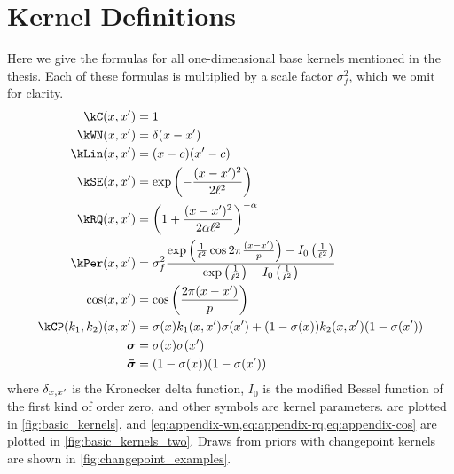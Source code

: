 \chapter{Kernel Definitions}
\label{ch:appendix-kernels}
\label{sec:kernel-definitions}

\newcommand{\scalefactor}{}


Here we give the formulas for all one-dimensional base kernels mentioned in the thesis.
Each of these formulas is multiplied by a scale factor $\sigma_f^2$, which we omit for clarity.
\begin{align}
\kC(\inputVar, \inputVar') & = \scalefactor 1 \\
\kWN(\inputVar, \inputVar') & = \scalefactor \delta(\inputVar - \inputVar') \label{eq:appendix-wn}\\
\kLin(\inputVar, \inputVar') & = \scalefactor (\inputVar - c)(\inputVar' - c)  \label{eq:appendix-lin} \\
\kSE(\inputVar, \inputVar') & = \scalefactor \exp\left(-\frac{(\inputVar - \inputVar')^2}{2\ell^2}\right)  \label{eq:appendix-se}\\
\kRQ(x, x') & = \scalefactor \left( 1 + \frac{(\inputVar - \inputVar')^2}{2\alpha\ell^2}\right)^{-\alpha}  \label{eq:appendix-rq}\\
\kPer(\inputVar, \inputVar') & =  \sigma_f^2 \frac{\exp\left(\frac{1}{\ell^2}\cos 2 \pi  \frac{(\inputVar - \inputVar')}{p}\right) - I_0\left(\frac{1}{\ell^2}\right)}{\exp\left(\frac{1}{\ell^2}\right) - I_0\left(\frac{1}{\ell^2}\right)} \label{eq:generalized-periodic} \\
\cos(x, x') & = \scalefactor \cos\left(\frac{2 \pi (x - x')}{p}\right) \label{eq:appendix-cos} \\
\kCP(\kernel_1, \kernel_2)(x, x') & = \scalefactor \sigma(x) k_1(x,x')\sigma(x') + (1-\sigma(x)) k_2(x,x')(1-\sigma(x')) \\
\boldsymbol\sigma & = \scalefactor \sigma(x)\sigma(x') \\
\boldsymbol{\bar\sigma} & = \scalefactor (1-\sigma(x))(1-\sigma(x'))
\end{align}
where $\delta_{x, x'}$ is the Kronecker delta function, $I_0$ is the modified Bessel function of the first kind of order zero, and other symbols are kernel parameters.
 are plotted in \cref{fig:basic_kernels}, and \cref{eq:appendix-wn,eq:appendix-rq,eq:appendix-cos} are plotted in \cref{fig:basic_kernels_two}.
Draws from \gp{} priors with changepoint kernels are shown in \cref{fig:changepoint_examples}.



